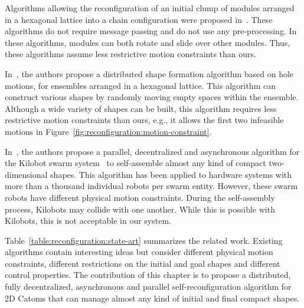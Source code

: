 Algorithms allowing the reconfiguration of an initial clump of modules arranged in a hexagonal lattice into a chain configuration were proposed in~\cite{wong2013deterministic, wong2015unpacking}. These algorithms do not require message passing and do not use any pre-processing. In these algorithms, modules can both rotate and slide over other modules. Thus, these algorithms assume less restrictive motion constraints than ours.

In~\cite{de2006scalable}, the authors propose a distributed shape formation algorithm based on hole motions, for ensembles arranged in a hexagonal lattice. This algorithm can construct various shapes by randomly moving empty spaces within the ensemble. Although a wide variety of shapes can be built, this algorithm requires less restrictive motion constraints than ours, e.g., it allows the first two infeasible motions in Figure~\ref{fig:reconfiguration:motion-constraint}.

In~\cite{rubenstein2014programmable}, the authors propose a parallel, decentralized and asynchronous algorithm for the Kilobot swarm system~\cite{rubenstein2014programmable} to self-assemble almost any kind of compact two-dimensional shapes. This algorithm has been applied to hardware systems with more than a thousand individual robots per swarm entity. However, these swarm robots have different physical motion constraints. During the self-assembly process, Kilobots may collide with one another. While this is possible with Kilobots, this is not acceptable in our system.

Table~\ref{table:reconfiguration:state-art} summarizes the related work. Existing algorithms contain interesting ideas but consider different physical motion constraints, different restrictions on the initial and goal shapes and different control properties. The contribution of this chapter is to propose a distributed, fully decentralized, asynchronous and parallel self-reconfiguration algorithm for 2D Catoms that can manage almost any kind of initial and final compact shapes.


